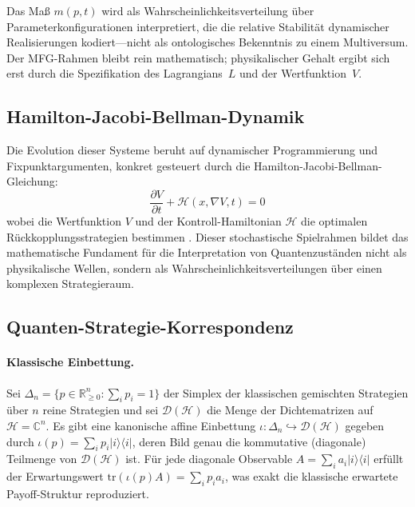 \documentclass[12pt,a4paper]{article}
\theoremstyle{remark}
\begin{document}
Das Ma\ss{} $m(p,t)$ wird als Wahrscheinlichkeitsverteilung \"uber Parameterkonfigurationen interpretiert, die die relative Stabilit\"at dynamischer Realisierungen kodiert---nicht als ontologisches Bekenntnis zu einem Multiversum. Der MFG-Rahmen bleibt rein mathematisch; physikalischer Gehalt ergibt sich erst durch die Spezifikation des Lagrangians~$L$ und der Wertfunktion~$V$.

\subsection{Hamilton-Jacobi-Bellman-Dynamik}

Die Evolution dieser Systeme beruht auf dynamischer Programmierung und Fixpunktargumenten, konkret gesteuert durch die Hamilton-Jacobi-Bellman-Gleichung:
\begin{equation}
\frac{\partial V}{\partial t} + \mathcal{H}\left(x, \nabla V, t\right) = 0
\end{equation}
wobei die Wertfunktion $V$ und der Kontroll-Hamiltonian $\mathcal{H}$ die optimalen R\"uckkopplungsstrategien bestimmen \citep{LasryLions2007}. Dieser stochastische Spielrahmen bildet das mathematische Fundament f\"ur die Interpretation von Quantenzust\"anden nicht als physikalische Wellen, sondern als Wahrscheinlichkeitsverteilungen \"uber einen komplexen Strategieraum.

\subsection{Quanten-Strategie-Korrespondenz}

\paragraph{Klassische Einbettung.}
Sei $\Delta_n = \{p \in \mathbb{R}_{\geq 0}^n : \sum_i p_i = 1\}$ der Simplex der klassischen gemischten Strategien \"uber $n$ reine Strategien und sei $\mathcal{D}(\mathcal{H})$ die Menge der Dichtematrizen auf $\mathcal{H} = \mathbb{C}^n$. Es gibt eine kanonische affine Einbettung $\iota: \Delta_n \hookrightarrow \mathcal{D}(\mathcal{H})$ gegeben durch $\iota(p) = \sum_i p_i |i\rangle\langle i|$, deren Bild genau die kommutative (diagonale) Teilmenge von $\mathcal{D}(\mathcal{H})$ ist. F\"ur jede diagonale Observable $A = \sum_i a_i |i\rangle\langle i|$ erf\"ullt der Erwartungswert $\mathrm{tr}(\iota(p) A) = \sum_i p_i a_i$, was exakt die klassische erwartete Payoff-Struktur reproduziert.
\end{document}
